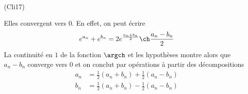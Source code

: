 \begin{tiny}(Cli17)\end{tiny} Elles convergent vers $0$. En effet, on peut écrire
\begin{displaymath}
 e^{a_n}+e^{b_n}=2e^{\frac{a_n+b_n}{2}}\ch\frac{a_n-b_n}{2}
\end{displaymath}
La continuité en $1$ de la fonction $\argch$ et les hypothèses montre alors que $a_n -b_n$ converge vers $0$ et on conclut par opérations à partir des décompositions
\begin{align*}
 a_n &= \frac{1}{2}(a_n+b_n) + \frac{1}{2}(a_n-b_n)\\
 b_n &= \frac{1}{2}(a_n+b_n) - \frac{1}{2}(a_n-b_n)
\end{align*}
